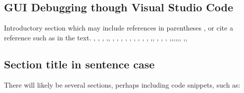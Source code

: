 \hypertarget{visual-studio-code-extensions}{%
\subsection{GUI Debugging though Visual Studio Code}
\label{visual-studio-code-extensions}}


Introductory section which may include references in parentheses
\citep{R}, or cite a reference such as \citet{R} in the text. \citep{Rcpp}, \citep{RcppEigen}, \citep{TMB}, \citep{Rextensions}
\citep{DebuggingC_Cpp},\citep{DebuggingRandCcodeinR}, \citep{CodeLLDB-manual}, \citep{CodeLLDB}, \citep{VSCodeTipsTricks}, 
\citep{VSCodeDownload}, \citep{VSCodeCCppExt}, \citep{VSCodeCCpp}, \citep{GDB}, \citep{ModernDebugging}, \citep{DDD},
\citep{ImprovingCppDebug},\citep{UsingRtools}, \citep{RcppIntro}, \citep{ihaka:1996}, \citep{RcppEigenLA},
\citep{TMBlaplace},\citep{DotC},\citep{DotC2},\citep{deSolve},\citep{Routines},\citep{LLDB},
\citep{Xcode},\citep{debug-visualize-ext},\citep{debug-visualize}

\hypertarget{section-title-in-sentence-case}{%
\subsection{Section title in sentence
case}\label{section-title-in-sentence-case}}

%
%
%



There will likely be several sections, perhaps including code snippets,
such as:

%
%

